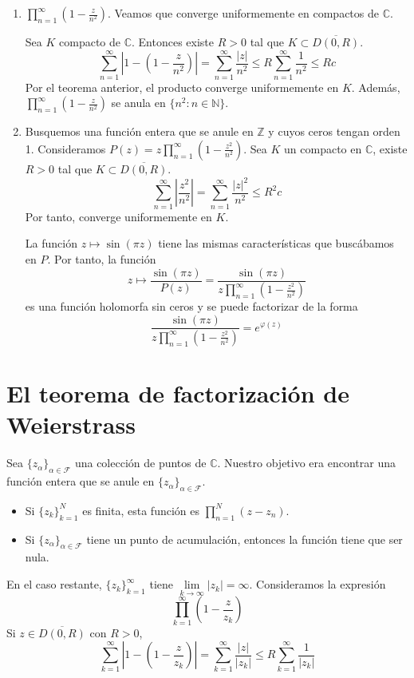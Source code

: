 \begin{example}
    \hfil
    \begin{enumerate}
        \item $\prod_{n=1}^\infty \left(1-\frac{z}{n^2}\right)$.
              Veamos que converge uniformemente en compactos de $\mathbb{C}$.

              Sea $K$ compacto de $\mathbb{C}$.
              Entonces existe $R > 0$ tal que $K \subset \overline{D(0, R)}$.
              $$\sum_{n=1}^\infty \left|1-\left(1-\frac{z}{n^2}\right)\right| = \sum_{n=1}^\infty \frac{|z|}{n^2} \leq R\sum_{n=1}^\infty \frac{1}{n^2} \leq Rc$$
              Por el teorema anterior, el producto converge uniformemente en $K$.
              Además, $\prod_{n=1}^\infty \left(1-\frac{z}{n^2}\right)$ se anula en $\{n^2 : n \in \mathbb{N}\}$.

        \item Busquemos una función entera que se anule en $\mathbb{Z}$ y cuyos ceros tengan orden 1.
              Consideramos $P(z) = z\prod_{n=1}^\infty \left(1-\frac{z^2}{n^2}\right)$.
              Sea $K$ un compacto en $\mathbb{C}$, existe $R > 0$ tal que $K \subset \overline{D(0, R)}$.
              $$\sum_{n=1}^\infty \left|\frac{z^2}{n^2}\right| = \sum_{n=1}^\infty \frac{|z|^2}{n^2} \leq R^2c$$
              Por tanto, converge uniformemente en $K$.

              La función $z \mapsto \sin(\pi z)$ tiene las mismas características que buscábamos en $P$.
              Por tanto, la función
              $$z \mapsto \frac{\sin(\pi z)}{P(z)} = \frac{\sin(\pi z)}{z\prod_{n=1}^\infty \left(1-\frac{z^2}{n^2}\right)}$$
              es una función holomorfa sin ceros y se puede factorizar de la forma
              $$\frac{\sin(\pi z)}{z\prod_{n=1}^\infty \left(1-\frac{z^2}{n^2}\right)} = e^{\varphi(z)}$$
    \end{enumerate}
\end{example}

\section{El teorema de factorización de Weierstrass}
Sea $\{z_\alpha\}_{\alpha \in \mathcal{F}}$ una colección de puntos de $\mathbb{C}$.
Nuestro objetivo era encontrar una función entera que se anule en $\{z_\alpha\}_{\alpha \in \mathcal{F}}$.
\begin{itemize}
    \item Si $\{z_k\}_{k=1}^N$ es finita, esta función es $\prod_{n=1}^N (z-z_n)$.
    \item Si $\{z_\alpha\}_{\alpha \in \mathcal{F}}$ tiene un punto de acumulación, entonces la función tiene que ser nula.
\end{itemize}
En el caso restante, $\{z_k\}_{k=1}^\infty$ tiene $\lim\limits_{k \to \infty} |z_k| = \infty$.
Consideramos la expresión
$$\prod_{k=1}^\infty \left(1 - \frac{z}{z_k}\right)$$
Si $z \in \overline{D(0, R)}$ con $R > 0$,
$$\sum_{k=1}^\infty \left|1-\left(1-\frac{z}{z_k}\right)\right| = \sum_{k=1}^\infty \frac{|z|}{|z_k|} \leq R\sum_{k=1}^\infty \frac{1}{|z_k|}$$

